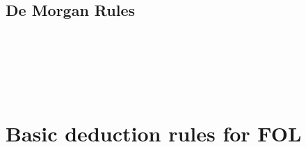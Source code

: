 \begin{multicols}{2}
\subsection*{De Morgan Rules}
\begin{fitchproof}

\\	

\\	

\\	
\end{fitchproof}
\end{multicols}

\newpage

\section{Basic deduction rules for FOL}

